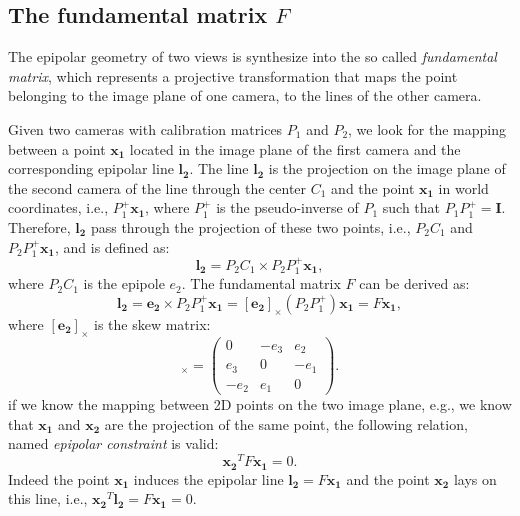 \subsection{The fundamental matrix \texorpdfstring{$F$}{F}}
The epipolar geometry of two views is synthesize into the so called \emph{fundamental matrix}, which represents a projective transformation that maps the point belonging to the image plane of one camera, to the lines of the other camera.

Given two cameras with calibration matrices $P_1$ and $P_2$, we look for the mapping between a point $\mathbf{x_1}$ located in the image plane of the first camera and the corresponding epipolar line $\mathbf{l_2}$. 
The line $\mathbf{l_2}$ is the projection on the image plane of the second camera of the line through the center $C_1$ and the point $\mathbf{x_1}$ in world coordinates, i.e., $P_1^+\mathbf{x_1}$, where $P_1^+$ is the pseudo-inverse of $P_1$ such that $P_1P_1^+ = \mathbf{I}$.
Therefore, $\mathbf{l_2}$ pass through the projection of these two points, i.e., $P_2C_1$ and $P_2P_1^+\mathbf{x_1}$, and is defined as:
\begin{equation}
 \mathbf{l_2} =  P_2C_1 \times P_2P_1^+\mathbf{x_1},
\end{equation}
where $P_2C_1$ is the epipole $e_2$. The fundamental matrix $F$ can be derived as:
\begin{equation}
 \mathbf{l_2} =  \mathbf{e_2} \times P_2P_1^+\mathbf{x_1} = [\mathbf{e_2}]_{\times} (P_2P_1^+)\mathbf{x_1} = F \mathbf{x_1},
\end{equation}
where $[\mathbf{e_2}]_{\times}$ is the skew matrix:
\begin{equation}
  [e]_{\times} =
  \begin{pmatrix}
    0   & -e_3 & e_2\\
    e_3 &   0  & -e_1\\
   -e_2 &  e_1 & 0
  \end{pmatrix}.
\end{equation}
if we know the mapping between 2D points on the two image plane, e.g., we know that $\mathbf{x_1}$ and $\mathbf{x_2}$ are the projection of the same point, the following relation, named \emph{epipolar constraint} is valid:
\begin{equation}
  \mathbf{x_2}^{T} F \mathbf{x_1} = 0.
\end{equation}
Indeed the point  $\mathbf{x_1}$ induces the epipolar line $\mathbf{l_2} = F \mathbf{x_1}$ and the point $\mathbf{x_2}$ lays on this line, i.e., $\mathbf{x_2}^{T} \mathbf{l_2} =  F \mathbf{x_1} = 0$.

